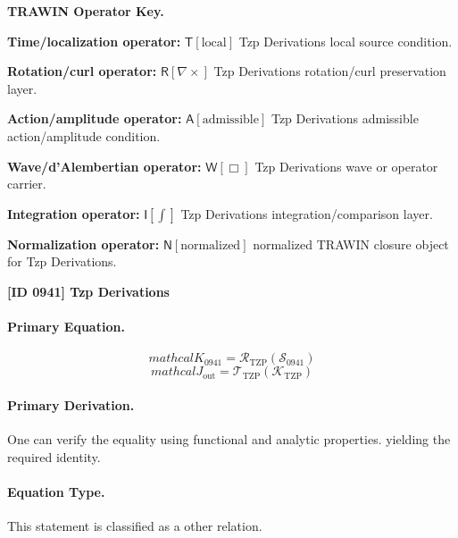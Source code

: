 \par\vspace{0.45\baselineskip}
\noindent\begin{minipage}[t]{\linewidth}
\begingroup
\small
\raggedright
\textbf{TRAWIN Operator Key.}\par
\noindent\textbf{Time/localization operator:} $\mathsf{T}\!\left[\mathrm{local}\right]$ Tzp Derivations local source condition.\par
\noindent\textbf{Rotation/curl operator:} $\mathsf{R}\!\left[\nabla\times\right]$ Tzp Derivations rotation/curl preservation layer.\par
\noindent\textbf{Action/amplitude operator:} $\mathsf{A}\!\left[\mathrm{admissible}\right]$ Tzp Derivations admissible action/amplitude condition.\par
\noindent\textbf{Wave/d'Alembertian operator:} $\mathsf{W}\!\left[\Box\right]$ Tzp Derivations wave or operator carrier.\par
\noindent\textbf{Integration operator:} $\mathsf{I}\!\left[\int\right]$ Tzp Derivations integration/comparison layer.\par
\noindent\textbf{Normalization operator:} $\mathsf{N}\!\left[\mathrm{normalized}\right]$ normalized TRAWIN closure object for Tzp Derivations.\par
\endgroup
\end{minipage}

\clearpage
\noindent\textbf{[ID 0941] Tzp Derivations}\par
\vspace{0.35em}
\paragraph{Primary Equation.}
\[
mathcal{K}_{0941}=\mathcal{R}_{\mathrm{TZP}}\!\left(\mathcal{S}_{0941}\right)
\]
\[
mathcal{J}_{\mathrm{out}} = \mathcal{T}_{\mathrm{TZP}}\!\left(\mathcal{K}_{\mathrm{TZP}}\right)
\]

\paragraph{Primary Derivation.}
One can verify the equality using functional and analytic properties. yielding the required identity.
\paragraph{Equation Type.}
This statement is classified as a other relation.

